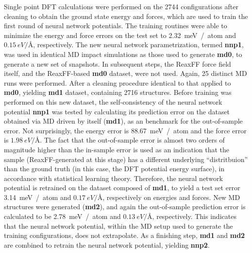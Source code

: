 \message{ !name(paper.tex)}\documentclass[manuscript=cmatex]{achemso}
\begin{document}
Single point DFT calculations were performed on the 2744 configurations after cleaning to obtain the ground state energy and forces, which are used to train the first round of neural network potentials. The training routines were able to minimize the energy and force errors on the test set to \SI{2.32}{meV / atom} and $\SI{0.15}{eV/\angstrom}$, respectively. The new neural network parametrization, termed \textbf{nnp1}, was used in identical MD impact simulations as those used to generate \textbf{md0}, to generate a new set of snapshots. In subsequent steps, the ReaxFF force field itself, and the ReaxFF-based \textbf{md0} dataset, were not used. Again, 25 distinct MD runs were performed. After a cleaning procedure identical to that applied to \textbf{md0}, yielding \textbf{md1} dataset, containing 2716 structures. Before training was performed on this new dataset, the self-consistency of the neural network potential \textbf{nnp1} was tested by calculating its prediction error on the dataset obtained via MD driven by itself (\textbf{md1}), as an benchmark for the out-of-sample error. Not surprisingly, the energy error is \SI{88.67}{meV / atom} and the force error is $\SI{1.98}{eV/\angstrom}$. The fact that the out-of-sample error is almost two orders of magnitude higher than the in-sample error is used as an indication that the sample (ReaxFF-generated at this stage) has a different underlying ``distritbuion'' than the ground truth (in this case, the DFT potential energy surface), in accordance with statistical learning theory. Therefore, the neural network potential is retrained on the dataset composed of \textbf{md1}, to yield a test set error \SI{3.14}{meV / atom} and $\SI{0.17}{eV/\angstrom}$, respectively on energies and forces. New MD structures were generated (\textbf{md2}), and again the out-of-sample prediction error is calculated to be \SI{2.78}{meV / atom} and $\SI{0.13}{eV/\angstrom}$, respectively. This indicates that the neural network potential, within the MD setup used to generate the training configurations, does not extrapolate. As a finishing step, \textbf{md1} and \textbf{md2} are combined to retrain the neural network potential, yielding \textbf{nnp2}. 
\end{document}
